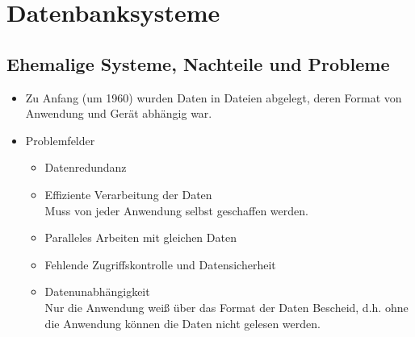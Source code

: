     \section{Datenbanksysteme} %
        \subsection{Ehemalige Systeme, Nachteile und Probleme} %
            \begin{itemize}
            	\item Zu Anfang (um 1960) wurden Daten in Dateien abgelegt, deren Format von Anwendung und Gerät abhängig war.
            	\item Problemfelder
                	\begin{itemize}
                		\item Datenredundanz
                		\item Effiziente Verarbeitung der Daten \\ Muss von jeder Anwendung selbst geschaffen werden.
                		\item Paralleles Arbeiten mit gleichen Daten
                		\item Fehlende Zugriffskontrolle und Datensicherheit
                		\item Datenunabhängigkeit \\ Nur die Anwendung weiß über das Format der Daten Bescheid, d.h. ohne die Anwendung können die Daten nicht gelesen werden.
                	\end{itemize}
            \end{itemize}

